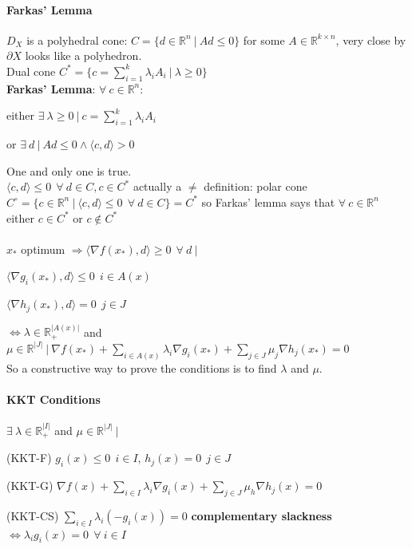 \documentclass[10pt]{report}
\begin{document}
\paragraph{Farkas' Lemma} $D_X$ is a polyhedral cone: $C=\{d\in \mathbb{R}^n\:|\:Ad\leq 0\}$ for some $A\in \mathbb{R}^{k\times n}$, very close by $\partial X$ looks like a polyhedron.\\
Dual cone $C^*=\{c=\sum_{i=1}^k\lambda_iA_i\:|\:\lambda \geq 0\}$\\
\textbf{Farkas' Lemma}: $\forall\:c\in \mathbb{R}^n$:
\begin{list}{}{}
	\item either $\exists\:\lambda\geq 0\:|\:c = \sum_{i=1}^k \lambda_iA_i$
	\item or $\exists\:d\:|\:Ad\leq 0\wedge\langle c,d\rangle > 0$
\end{list}
One and only one is true.\\
$\langle c,d\rangle \leq 0\:\:\forall\:d\in C, c\in C^*$ actually a $\neq$ definition: polar cone $C^\circ=\{c\in \mathbb{R}^n\:|\:\langle c,d\rangle\leq 0\:\:\forall\:d\in C\}=C^*$ so Farkas' lemma says that $\forall\:c\in \mathbb{R}^n$ either $c\in C^*$ or $c\not\in C^*$\\\\
$x_*$ optimum $\Rightarrow \langle\nabla f(x_*),d\rangle\geq 0\:\:\forall\:d\:|\:$
\begin{list}{}{}
	\item $\langle\nabla g_i(x_*),d\rangle\leq 0\:\:i\in A(x)$
	\item $\langle\nabla h_j(x_*),d\rangle = 0\:\:j\in J$
\end{list}
$\Leftrightarrow\lambda\in \mathbb{R}_+^{|A(x)|}$ and $\mu \in \mathbb{R}^{|J|}\:|\:\nabla f(x_*) + \sum_{i\in A(x)}\lambda_i\nabla g_i(x_*) + \sum_{j\in J} \mu_j\nabla h_j(x_*)=0$\\
So a constructive way to prove the conditions is to find $\lambda$ and $\mu$.
\paragraph{KKT Conditions} $\exists\:\lambda\in \mathbb{R}_+^{|I|}$ and $\mu\in \mathbb{R}^{|J|}\:|$\begin{list}{}{}
	\item[(KKT-F)] $g_i(x)\leq 0\:\:i\in I$, $h_j(x) = 0\:\:j\in J$
	\item[(KKT-G)] $\nabla f(x) + \sum_{i\in I}\lambda_i\nabla g_i(x) + \sum_{j\in J}\mu_h\nabla h_j(x) = 0$
	\item[(KKT-CS)] $\sum_{i\in I}\lambda_i(-g_i(x)) = 0$ \textbf{complementary slackness} $\Leftrightarrow \lambda_ig_i(x) = 0\:\:\forall\:i\in I$
\end{list}
\end{document}
